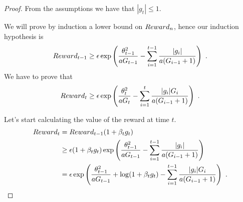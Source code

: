 \begin{proof}
% 


From the assumptions we have that $|g_t|\leq 1$.

We will prove by induction a lower bound on $Reward_n$, hence our induction hypothesis is
\[
Reward_{t-1}\geq \epsilon \exp\left(\frac{\theta_{t-1}^2}{a G_{t-1}}- \sum_{i=1}^{t-1} \frac{|g_i|}{a (G_{i-1} + 1)}\right)~.
\]
We have to prove that 
\[
Reward_{t}\geq \epsilon \exp\left(\frac{\theta_{t}^2}{a G_t}- \sum_{i=1}^{t} \frac{|g_i| G_i}{a (G_{i-1} + 1)}\right)~.
\]

Let's start calculating the value of the reward at time $t$.
\begin{align*}
Reward_{t} &= Reward_{t-1} (1+\beta_t g_t) \\
&\geq \epsilon (1+\beta_t g_t)\exp\left(\frac{\theta_{t-1}^2}{a G_{t-1}}- \sum_{i=1}^{t-1} \frac{|g_i|}{a (G_{i-1} + 1) }\right) \\
&=  \epsilon \exp\left(\frac{\theta_{t-1}^2}{a G_{t-1}}+\log(1+\beta_t g_t)- \sum_{i=1}^{t-1} \frac{|g_i| G_i}{a (G_{i-1} + 1)}\right)~.
\end{align*}


\end{proof}
